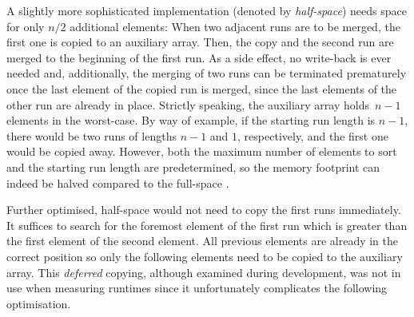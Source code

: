 A slightly more sophisticated implementation (denoted by \emph{half-space}) needs space for only \(n/2\) additional elements:
When two adjacent runs are to be merged, the first one is copied to an auxiliary array.
Then, the copy and the second run are merged to the beginning of the first run.
As a side effect, no write-back is ever needed and, additionally, the merging of two runs can be terminated prematurely once the last element of the copied run is merged, since the last elements of the other run are already in place.
Strictly speaking, the auxiliary array holds~\(n-1\) elements in the worst-case.
By way of example, if the starting run length is \(n - 1\), there would be two runs of lengths \(n - 1\) and \(1\), respectively, and the first one would be copied away.
However, both the maximum number of elements to sort and the starting run length are predetermined, so the memory footprint can indeed be halved compared to the full-space \MS{}.

Further optimised, half-space \MS{} would not need to copy the first runs immediately.
It suffices to search for the foremost element of the first run which is greater than the first element of the second element.
All previous elements are already in the correct position so only the following elements need to be copied to the auxiliary array.
This \emph{deferred} copying, although examined during development, was not in use when measuring runtimes since it unfortunately complicates the following optimisation.


